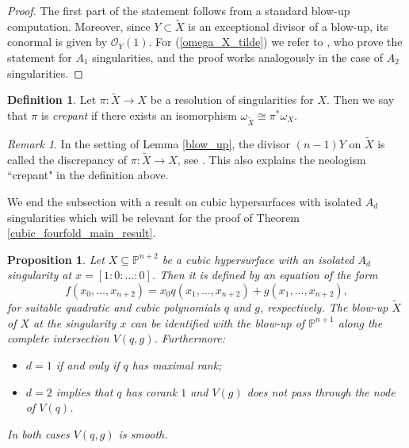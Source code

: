 \documentclass[a4paper, twoside, 11pt]{amsart}
\newtheorem{proposition}[theorem]{Proposition}
\theoremstyle{definition}
\newtheorem{definition}[theorem]{Definition}
\theoremstyle{remark}
\newtheorem{remark}[theorem]{Remark}
\numberwithin{equation}{theorem}
\begin{document}
\begin{proof}
    The first part of the statement follows from a standard blow-up computation. Moreover, since $Y\subset \widetilde{X}$ is an exceptional divisor of a blow-up, its conormal is given by $\mathcal{O}_Y(1)$. For (\ref{omega_X_tilde}) we refer to \cite[Proposition 3.5]{Kernels_nodal}, who prove the statement for $A_1$ singularities, and the proof works analogously in the case of $A_2$ singularities.
\end{proof}
\begin{definition}\label{crepant_res}
	Let $\pi\colon \widetilde{X} \to X$ be a resolution of singularities for $X$. Then we say that $\pi$ is \textit{crepant} if there exists an isomorphism $\omega_{\widetilde{X}} \cong \pi^*\omega_X$. 
\end{definition}
\begin{remark}
	In the setting of Lemma \ref{blow_up}, the divisor $(n-1)Y$ on $\widetilde{X}$ is called the discrepancy of $\pi\colon \widetilde{X} \to X$, see \cite[§1.1]{Reid}. This also explains the neologism ``crepant" in the definition above.
\end{remark}
We end the subsection with a result on cubic hypersurfaces with isolated $A_d$ singularities which will be relevant for the proof of Theorem \ref{cubic_fourfold_main_result}. 
\begin{proposition}\label{fundamental}
	Let $X \subseteq \mathbb{P}^{n+2}$ be a cubic hypersurface with an isolated $A_d$ singularity at $x = [1:0:\dots:0]$. Then it is defined by an equation of the form
	\begin{equation*}
		f(x_0,\dots,x_{n+2}) = x_0q(x_1,\dots,x_{n+2}) + g(x_1,\dots, x_{n+2}),
	\end{equation*}
	for suitable quadratic and cubic polynomials $q$ and $g$, respectively. The blow-up $\widetilde{X}$ of $X$ at the singularity $x$ can be identified with the blow-up of $\mathbb{P}^{n+1}$ along the complete intersection $V(q,g)$. Furthermore:
	\begin{itemize}
		\item $d=1$ if and only if $q$ has maximal rank;
		\item $d=2$ implies that $q$ has corank $1$ and $V(g)$ does not pass through the node of $V(q)$.
	\end{itemize}
	In both cases $V(q,g)$ is smooth.
\end{proposition}
\end{document}
